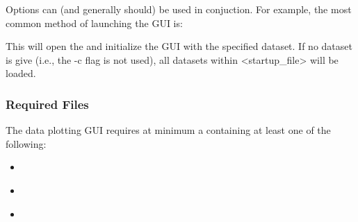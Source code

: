 \documentclass[letterpaper,10pt,english]{sphinxmanual}
\begin{document}
Options can (and generally should) be used in conjuction.
For example, the most common method of launching the GUI is:

\begin{sphinxVerbatim}[commandchars=\\\{\}]
    
\end{sphinxVerbatim}

This will open the {\hyperref[\detokenize{content/api_core/input_files:startup-file}]{}} and initialize the GUI with the specified dataset. If no dataset is give (i.e., the -c flag is not used), all datasets within \textless{}startup\_file\textgreater{} will be loaded.


\subsubsection{Required Files}
\label{\detokenize{content/data_plot/getting_started:required-files}}
The data plotting GUI requires at minimum a {\hyperref[\detokenize{content/api_core/input_files:startup-file}]{}} containing at least one of the following:
\begin{itemize}
\item {} 
{\hyperref[\detokenize{content/api_core/input_files:list-file}]{}}

\item {} 
{\hyperref[\detokenize{content/api_core/input_files:data-file}]{}}

\item {} 
{\hyperref[\detokenize{content/api_core/input_files:response-file}]{}}

\end{itemize}
\end{document}
